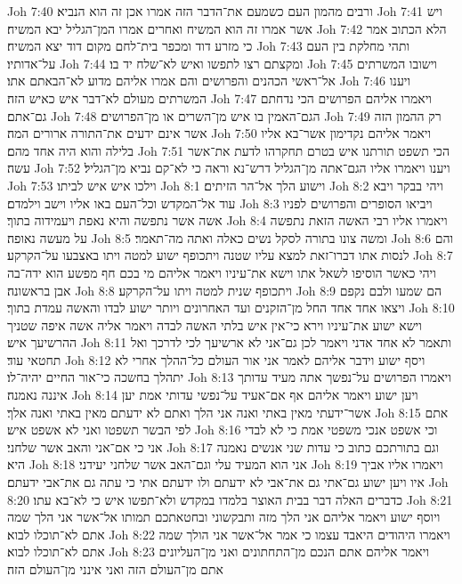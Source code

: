 Joh 7:40  ורבים מהמון העם כשמעם את־הדבר הזה אמרו אכן זה הוא הנביא׃
Joh 7:41  ויש אשר אמרו זה הוא המשיח ואחרים אמרו המן־הגליל יבא המשיח׃
Joh 7:42  הלא הכתוב אמר כי מזרע דוד ומכפר בית־לחם מקום דוד יצא המשיח׃
Joh 7:43  ותהי מחלקת בין העם על־אדותיו׃
Joh 7:44  ומקצתם רצו לתפשו ואיש לא־שלח יד בו׃
Joh 7:45  וישובו המשרתים אל־ראשי הכהנים והפרושים והם אמרו אליהם מדוע לא־הבאתם אתו׃
Joh 7:46  ויענו המשרתים מעולם לא־דבר איש כאיש הזה׃
Joh 7:47  ויאמרו אליהם הפרושים הכי נדחתם גם־אתם׃
Joh 7:48  הגם־האמין בו איש מן־השרים או מן־הפרושים׃
Joh 7:49  רק ההמון הזה אשר אינם ידעים את־התורה ארורים המה׃
Joh 7:50  ויאמר אליהם נקדימון אשר־בא אליו בלילה והוא היה אחד מהם׃
Joh 7:51  הכי תשפט תורתנו איש בטרם תחקרהו לדעת את־אשר עשה׃
Joh 7:52  ויענו ויאמרו אליו הגם־אתה מן־הגליל דרש־נא וראה כי לא־קם נביא מן־הגליל׃
Joh 7:53  וילכו איש איש לביתו׃
Joh 8:1  וישוע הלך אל־הר הזיתים׃
Joh 8:2  ויהי בבקר ויבא עוד אל־המקדש וכל־העם באו אליו וישב וילמדם׃
Joh 8:3  ויביאו הסופרים והפרושים לפניו אשה אשר נתפשה והיא נאפת ויעמידוה בתוך׃
Joh 8:4  ויאמרו אליו רבי האשה הזאת נתפשה על מעשה נאופה׃
Joh 8:5  ומשה צונו בתורה לסקל נשים כאלה ואתה מה־תאמר׃
Joh 8:6  והם לנסות אתו דברו־זאת למצא עליו שטנה ויתכופף ישוע למטה ויתו באצבעו על־הקרקע׃
Joh 8:7  ויהי כאשר הוסיפו לשאל אתו וישא את־עיניו ויאמר אליהם מי בכם חף מפשע הוא ידה־בה אבן בראשונה׃
Joh 8:8  ויתכופף שנית למטה ויתו על־הקרקע׃
Joh 8:9  הם שמעו ולבם נקפם ויצאו אחד אחד החל מן־הזקנים ועד האחרונים ויותר ישוע לבדו והאשה עמדת בתוך׃
Joh 8:10  וישא ישוע את־עיניו וירא כי־אין איש בלתי האשה לבדה ויאמר אליה אשה איפה שטניך ההרשיעך איש׃
Joh 8:11  ותאמר לא אחד אדני ויאמר לכן גם־אני לא ארשיעך לכי לדרכך ואל תחטאי עוד׃
Joh 8:12  ויסף ישוע וידבר אליהם לאמר אני אור העולם כל־ההלך אחרי לא יתהלך בחשכה כי־אור החיים יהיה־לו׃
Joh 8:13  ויאמרו הפרושים על־נפשך אתה מעיד עדותך איננה נאמנה׃
Joh 8:14  ויען ישוע ויאמר אליהם אף אם־אעיד על־נפשי עדותי אמת יען אשר־ידעתי מאין באתי ואנה אני הלך ואתם לא ידעתם מאין באתי ואנה אלך׃
Joh 8:15  אתם לפי הבשר תשפטו ואני לא אשפט איש׃
Joh 8:16  וכי אשפט אנכי משפטי אמת כי לא לבדי אני כי אם־אני והאב אשר שלחני׃
Joh 8:17  וגם בתורתכם כתוב כי עדות שני אנשים נאמנה היא׃
Joh 8:18  אני הוא המעיד עלי וגם־האב אשר שלחני יעידני׃
Joh 8:19  ויאמרו אליו אביך איו ויען ישוע גם־אתי גם את־אבי לא ידעתם ולו ידעתם אתי כי עתה גם את־אבי ידעתם׃
Joh 8:20  כדברים האלה דבר בבית האוצר בלמדו במקדש ולא־תפשו איש כי לא־בא עתו׃
Joh 8:21  ויוסף ישוע ויאמר אליהם אני הלך מזה ותבקשוני ובחטאתכם תמותו אל־אשר אני הלך שמה אתם לא־תוכלו לבוא׃
Joh 8:22  ויאמרו היהודים היאבד עצמו כי אמר אל־אשר אני הולך שמה אתם לא־תוכלו לבוא׃
Joh 8:23  ויאמר אליהם אתם הנכם מן־התחתונים ואני מן־העליונים אתם מן־העולם הזה ואני אינני מן־העולם הזה׃
